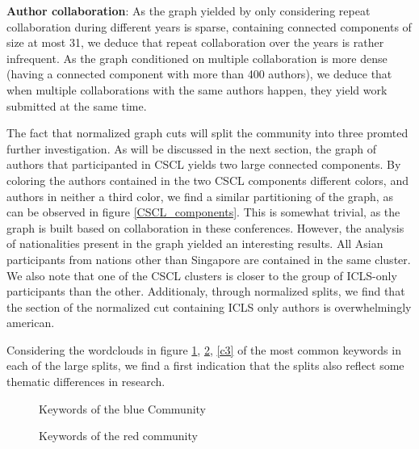 \documentclass[article,twocolumn]{IEEEtran}
\begin{document}
    \textbf{Author collaboration}: As the graph yielded by only considering
repeat collaboration during different years is sparse, containing
connected components of size at most 31, we deduce that repeat
collaboration over the years is rather infrequent. As the graph
conditioned on multiple collaboration is more dense (having a connected
component with more than 400 authors), we deduce that when multiple
collaborations with the same authors happen, they yield work submitted
at the same time.

The fact that normalized graph cuts will split the community into three
promted further investigation. As will be discussed in the next section,
the graph of authors that participanted in CSCL yields two large
connected components. By coloring the authors contained in the two CSCL
components different colors, and authors in neither a third color, we
find a similar partitioning of the graph, as can be observed in figure
\ref{CSCL_components}. This is somewhat trivial, as the graph is built
based on collaboration in these conferences. However, the analysis of
nationalities present in the graph yielded an interesting results. All
Asian participants from nations other than Singapore are contained in
the same cluster. We also note that one of the CSCL clusters is closer
to the group of ICLS-only participants than the other. Additionaly,
through normalized splits, we find that the section of the normalized
cut containing ICLS only authors is overwhelmingly american.

Considering the wordclouds in figure \ref{c1}, \ref{c2}, \ref{c3} of the
most common keywords in each of the large splits, we find a first
indication that the splits also reflect some thematic differences in
research.


    \begin{figure}
        \begin{center}\end{center}
        \caption{Keywords of the blue Community}
        \label{c1}
    \end{figure}
    

    \begin{figure}
        \begin{center}\end{center}
        \caption{Keywords of the red community}
        \label{c2}
    \end{figure}
    
\end{document}
